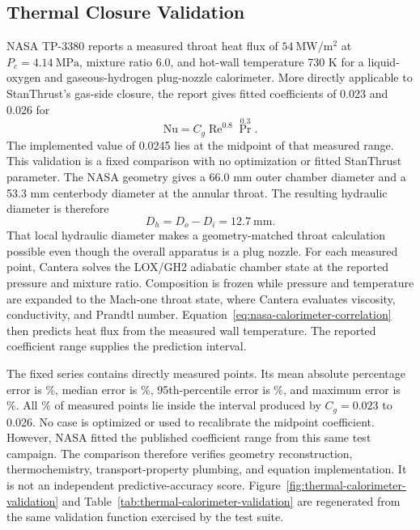 \documentclass[11pt]{article}
\newcommand{\Rey}{\operatorname{Re}}
\begin{document}
\subsection{Thermal Closure Validation}
NASA TP-3380 reports a measured throat heat flux of $54\ \mathrm{MW/m^2}$ at $P_c=4.14\ \mathrm{MPa}$, mixture ratio 6.0, and hot-wall temperature 730 K for a liquid-oxygen and gaseous-hydrogen plug-nozzle calorimeter. More directly applicable to StanThrust's gas-side closure, the report gives fitted coefficients of 0.023 and 0.026 for
\begin{equation}
\mathrm{Nu}=C_g\Rey^{0.8}\Pr^{0.3}.
\label{eq:nasa-calorimeter-correlation}
\end{equation}
The implemented value of 0.0245 lies at the midpoint of that measured range. This validation is a fixed comparison with no optimization or fitted StanThrust parameter. The NASA geometry gives a 66.0 mm outer chamber diameter and a 53.3 mm centerbody diameter at the annular throat. The resulting hydraulic diameter is therefore
\begin{equation}
D_h=D_o-D_i=12.7\ \mathrm{mm}.
\label{eq:nasa-annular-hydraulic-diameter}
\end{equation}
That local hydraulic diameter makes a geometry-matched throat calculation possible even though the overall apparatus is a plug nozzle. For each measured point, Cantera solves the LOX/GH2 adiabatic chamber state at the reported pressure and mixture ratio. Composition is frozen while pressure and temperature are expanded to the Mach-one throat state, where Cantera evaluates viscosity, conductivity, and Prandtl number. Equation~\eqref{eq:nasa-calorimeter-correlation} then predicts heat flux from the measured wall temperature. The reported coefficient range supplies the prediction interval.

The fixed series contains \ThermalValidationCaseCount{} directly measured points. Its mean absolute percentage error is \ThermalValidationMeanError\%, median error is \ThermalValidationMedianError\%, 95th-percentile error is \ThermalValidationNinetyFifthError\%, and maximum error is \ThermalValidationMaxError\%. All \ThermalValidationCoverage\% of measured points lie inside the interval produced by $C_g=0.023$ to 0.026. No case is optimized or used to recalibrate the midpoint coefficient. However, NASA fitted the published coefficient range from this same test campaign. The comparison therefore verifies geometry reconstruction, thermochemistry, transport-property plumbing, and equation implementation. It is not an independent predictive-accuracy score. Figure~\ref{fig:thermal-calorimeter-validation} and Table~\ref{tab:thermal-calorimeter-validation} are regenerated from the same validation function exercised by the test suite.
\end{document}
